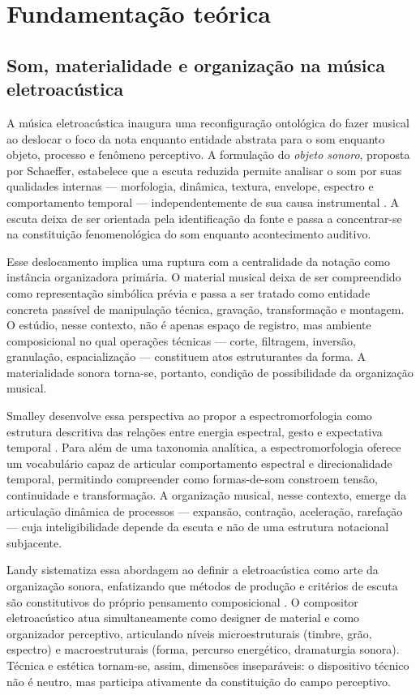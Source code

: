 \chapter{Fundamentação teórica}

\section{Som, materialidade e organização na música eletroacústica}

A música eletroacústica inaugura uma reconfiguração ontológica do fazer musical ao deslocar o foco da nota enquanto entidade abstrata para o som enquanto objeto, processo e fenômeno perceptivo. A formulação do \emph{objeto sonoro}, proposta por Schaeffer, estabelece que a escuta reduzida permite analisar o som por suas qualidades internas — morfologia, dinâmica, textura, envelope, espectro e comportamento temporal — independentemente de sua causa instrumental \cite{schaeffer1966traite}. A escuta deixa de ser orientada pela identificação da fonte e passa a concentrar-se na constituição fenomenológica do som enquanto acontecimento auditivo.

Esse deslocamento implica uma ruptura com a centralidade da notação como instância organizadora primária. O material musical deixa de ser compreendido como representação simbólica prévia e passa a ser tratado como entidade concreta passível de manipulação técnica, gravação, transformação e montagem. O estúdio, nesse contexto, não é apenas espaço de registro, mas ambiente composicional no qual operações técnicas — corte, filtragem, inversão, granulação, espacialização — constituem atos estruturantes da forma. A materialidade sonora torna-se, portanto, condição de possibilidade da organização musical.

Smalley desenvolve essa perspectiva ao propor a espectromorfologia como estrutura descritiva das relações entre energia espectral, gesto e expectativa temporal \cite{smalley1997spectromorphology}. Para além de uma taxonomia analítica, a espectromorfologia oferece um vocabulário capaz de articular comportamento espectral e direcionalidade temporal, permitindo compreender como formas-de-som constroem tensão, continuidade e transformação. A organização musical, nesse contexto, emerge da articulação dinâmica de processos — expansão, contração, aceleração, rarefação — cuja inteligibilidade depende da escuta e não de uma estrutura notacional subjacente.

Landy sistematiza essa abordagem ao definir a eletroacústica como arte da organização sonora, enfatizando que métodos de produção e critérios de escuta são constitutivos do próprio pensamento composicional \cite{landy2007soundorganization}. O compositor eletroacústico atua simultaneamente como designer de material e como organizador perceptivo, articulando níveis microestruturais (timbre, grão, espectro) e macroestruturais (forma, percurso energético, dramaturgia sonora). Técnica e estética tornam-se, assim, dimensões inseparáveis: o dispositivo técnico não é neutro, mas participa ativamente da constituição do campo perceptivo.

